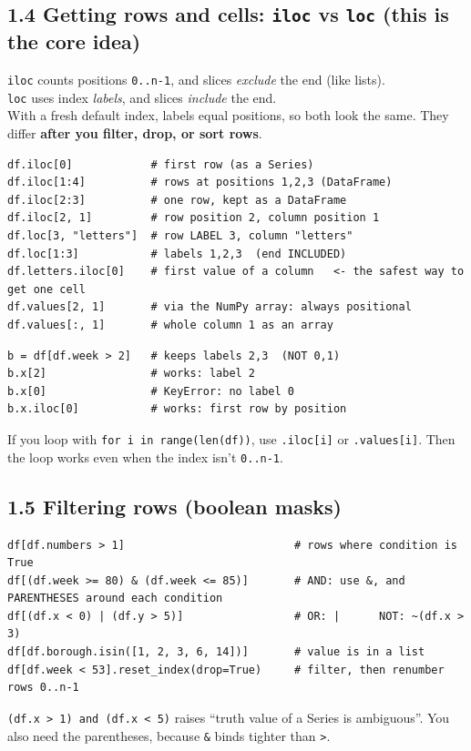 \documentclass[10pt]{article}
\newcommand{\code}[1]{\lstinline[basicstyle=\ttfamily\small]{#1}}
\begin{document}
\subsection*{1.4 Getting rows and cells: \texttt{iloc} vs \texttt{loc} (this is the core idea)}
\begin{keyrule}[iloc = position, loc = label]
\code{iloc} counts positions \code{0..n-1}, and slices \emph{exclude} the end (like lists).\\
\code{loc} uses index \emph{labels}, and slices \emph{include} the end.\\
With a fresh default index, labels equal positions, so both look the same. They differ \textbf{after you filter, drop, or sort rows}.
\end{keyrule}
\begin{lstlisting}
df.iloc[0]            # first row (as a Series)
df.iloc[1:4]          # rows at positions 1,2,3 (DataFrame)
df.iloc[2:3]          # one row, kept as a DataFrame
df.iloc[2, 1]         # row position 2, column position 1
df.loc[3, "letters"]  # row LABEL 3, column "letters"
df.loc[1:3]           # labels 1,2,3  (end INCLUDED)
df.letters.iloc[0]    # first value of a column   <- the safest way to get one cell
df.values[2, 1]       # via the NumPy array: always positional
df.values[:, 1]       # whole column 1 as an array
\end{lstlisting}
\begin{trap}
\begin{lstlisting}
b = df[df.week > 2]   # keeps labels 2,3  (NOT 0,1)
b.x[2]                # works: label 2
b.x[0]                # KeyError: no label 0
b.x.iloc[0]           # works: first row by position
\end{lstlisting}
If you loop with \code{for i in range(len(df))}, use \code{.iloc[i]} or \code{.values[i]}. Then the loop works even when the index isn't \code{0..n-1}.
\end{trap}

\subsection*{1.5 Filtering rows (boolean masks)}
\begin{lstlisting}
df[df.numbers > 1]                          # rows where condition is True
df[(df.week >= 80) & (df.week <= 85)]       # AND: use &, and PARENTHESES around each condition
df[(df.x < 0) | (df.y > 5)]                 # OR: |      NOT: ~(df.x > 3)
df[df.borough.isin([1, 2, 3, 6, 14])]       # value is in a list
df[df.week < 53].reset_index(drop=True)     # filter, then renumber rows 0..n-1
\end{lstlisting}
\begin{trap}
\code{(df.x > 1) and (df.x < 5)} raises ``truth value of a Series is ambiguous''. You also need the parentheses, because \code{&} binds tighter than \code{>}.
\end{trap}
\end{document}
